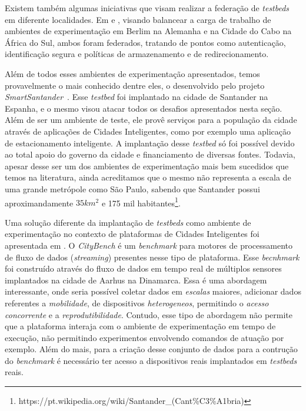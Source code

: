 Existem também algumas iniciativas que visam realizar a federação de \textit{testbeds} em diferente localidades.
Em \cite{mwangama_2013} e \cite{corici_2014}, visando balancear a carga de trabalho de ambientes de experimentação em Berlim na Alemanha e na Cidade do Cabo na África do Sul, ambos foram federados,
tratando de pontos como autenticação, identificação segura e políticas de armazenamento e de redirecionamento.

Além de todos esses ambientes de experimentação apresentados, temos provavelmente o mais conhecido dentre eles, o desenvolvido pelo projeto \textit{SmartSantander}~\cite{sanchez_2014}.
Esse \textit{testbed} foi implantado na cidade de Santander na Espanha, e o mesmo visou atacar todos os desafios apresentados nesta seção.
Além de ser um ambiente de teste, ele provê serviços para a população da cidade através de aplicações de Cidades Inteligentes, como por exemplo uma aplicação de estacionamento inteligente.
A implantação desse \textit{testbed} só foi possível devido ao total apoio do governo da cidade e financiamento de diversas fontes.
Todavia, apesar desse ser um dos ambientes de experimentação mais bem sucedidos que temos na literatura, ainda acreditamos que o mesmo não representa a escala de uma grande metrópole como
São Paulo, sabendo que Santander possui aproximandamente $ 35 km^2 $ e 175 mil habitantes\footnote{https://pt.wikipedia.org/wiki/Santander\_(Cant\%C3\%A1bria)}.

Uma solução diferente da implantação de \textit{testbeds} como ambiente de experimentação no contexto de plataformas de Cidades Inteligentes foi apresentada em \cite{ali_2015}.
O \textit{CityBench} é um \textit{benchmark} para motores de processamento de fluxo de dados (\textit{streaming}) presentes nesse tipo de plataforma.
Esse \textit{becnhmark} foi construído através do fluxo de dados em tempo real de múltiplos sensores implantados na cidade de Aarhus na Dinamarca.
Essa é uma abordagem interessante, onde seria possível coletar dados em \textit{escalas} maiores, adicionar dados referentes a \textit{mobilidade}, de dispositivos \textit{heterogeneos}, permitindo
o \textit{acesso concorrente} e a \textit{reprodutibilidade}.
Contudo, esse tipo de abordagem não permite que a plataforma interaja com o ambiente de experimentação em tempo de execução, não permitindo experimentos envolvendo comandos de atuação por exemplo.
Além do mais, para a criação desse conjunto de dados para a contrução do \textit{benchmark} é necessário ter acesso a dispositivos reais implantados em \textit{testbeds} reais.

